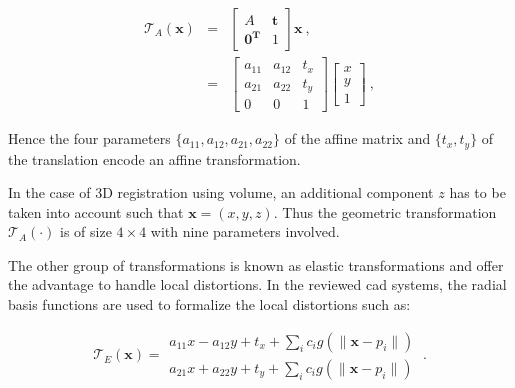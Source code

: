 \begin{eqnarray}
	\mathcal{T}_A(\mathbf{x}) & = & \begin{bmatrix}
		A & \mathbf{t} \\
		\mathbf{0^T} & 1
	\end{bmatrix} \mathbf{x} \ , \nonumber \\
	& = & \begin{bmatrix}
		a_{11} & a_{12} & t_x \\
		a_{21} & a_{22} & t_y \\
		0 & 0 & 1
	\end{bmatrix}\begin{bmatrix}
		x \\
		y \\
		1
	\end{bmatrix} \ , \label{eq:afftra}%
\end{eqnarray}

%
%

Hence the four parameters $\{a_{11},a_{12},a_{21},a_{22}\}$ of the affine matrix and $\{ t_x, t_y \}$ of the translation encode an affine transformation.

In the case of 3D registration using volume, an additional component $z$ has to be taken into account such that $\mathbf{x} = (x,y,z)$. Thus the geometric transformation $\mathcal{T}_A(\cdot)$ is of size $4 \times 4$ with nine parameters involved.

The other group of transformations is known as elastic transformations and offer the advantage to handle local distortions. In the reviewed \ac{cad} systems, the radial basis functions are used to formalize the local distortions such as:

\begin{equation}
	\mathcal{T}_E(\mathbf{x}) = \begin{matrix}
	a_{11} x - a_{12} y + t_x + \sum_i c_i g(\| \mathbf{x} - p_i \|) \\
	a_{21} x + a_{22} y + t_y + \sum_i c_i g(\| \mathbf{x} - p_i \|)
	\end{matrix} \ .
\end{equation}

